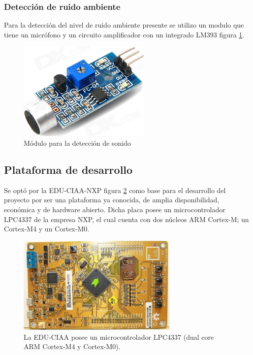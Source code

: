 \subsubsection{Detección de ruido ambiente}

Para la detección del nivel de ruido ambiente presente se utilizo un modulo que tiene un micrófono y un circuito amplificador con un integrado LM393 figura \ref{fig:detectorSonido}.

\begin{figure}[h]
	\centering
	\includegraphics[scale=.5]{./Figures/detectorSonido.png}
	\caption{Módulo para la detección de sonido}
	\label{fig:detectorSonido}
\end{figure}

\subsection{Plataforma de desarrollo}
Se optó por la EDU-CIAA-NXP figura \ref{fig:eduCiaaNxp} como base para el desarrollo del proyecto por ser una plataforma ya conocida, de amplia disponibilidad, económica y de hardware abierto. Dicha placa posee un microcontrolador LPC4337 de la empresa NXP, el cual cuenta con dos núcleos ARM Cortex-M; un Cortex-M4 y un Cortex-M0.

\begin{figure}[H]
	\centering
	\includegraphics[width=0.7\textwidth]{./Figures/eduCiaaNxp.pdf}
	\caption{La EDU-CIAA posee un microcontrolador LPC4337 (dual core ARM Cortex-M4 y Cortex-M0).}
	\label{fig:eduCiaaNxp}
\end{figure}

